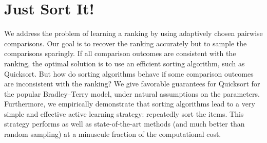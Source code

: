 \chapter{Just Sort It!}

We address the problem of learning a ranking by using adaptively chosen pairwise comparisons.
Our goal is to recover the ranking accurately but to sample the comparisons sparingly.
If all comparison outcomes are consistent with the ranking, the optimal solution is to use an efficient sorting algorithm, such as Quicksort.
But how do sorting algorithms behave if some comparison outcomes are inconsistent with the ranking?
We give favorable guarantees for Quicksort for the popular Bradley--Terry model, under natural assumptions on the parameters.
Furthermore, we empirically demonstrate that sorting algorithms lead to a very simple and effective active learning strategy: repeatedly sort the items.
This strategy performs as well as state-of-the-art methods (and much better than random sampling) at a minuscule fraction of the computational cost.










